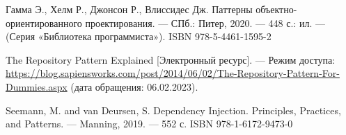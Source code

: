 \begin{thebibliography}{}
	Гамма Э., Хелм Р., Джонсон Р., Влиссидес Дж. Паттерны объектно-ориентированного проектирования. — СПб.: Питер, 2020. — 448 с.: ил. — (Серия «Библиотека программиста»). ISBN 978-5-4461-1595-2
	
	The Repository Pattern Explained [Электронный ресурс]. — Режим доступа: \url{https://blog.sapiensworks.com/post/2014/06/02/The-Repository-Pattern-For-Dummies.aspx} (дата обращения: 06.02.2023).
	
	Seemann, M. and van Deursen, S. Dependency Injection. Principles, Practices, and Patterns. — Manning, 2019. — 552 с. ISBN 978-1-6172-9473-0
\end{thebibliography}
\endgroup

\pagebreak